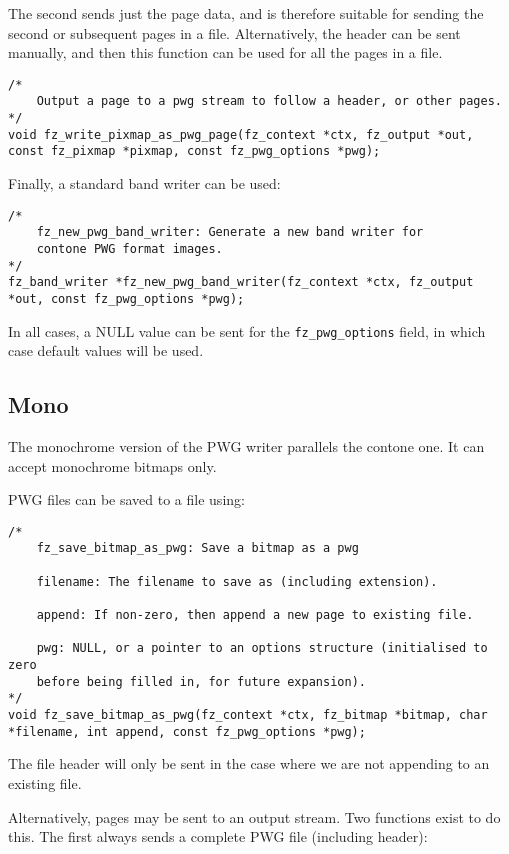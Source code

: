 \documentclass[oneside]{book}
\begin{document}
The second sends just the page data, and is therefore suitable for sending the second or subsequent pages in a file. Alternatively, the header can be sent manually, and then this function can be used for all the pages in a file.

\begin{lstlisting}
/*
	Output a page to a pwg stream to follow a header, or other pages.
*/
void fz_write_pixmap_as_pwg_page(fz_context *ctx, fz_output *out, const fz_pixmap *pixmap, const fz_pwg_options *pwg);
\end{lstlisting}

Finally, a standard band writer can be used:

\begin{lstlisting}
/*
	fz_new_pwg_band_writer: Generate a new band writer for
	contone PWG format images.
*/
fz_band_writer *fz_new_pwg_band_writer(fz_context *ctx, fz_output *out, const fz_pwg_options *pwg);
\end{lstlisting}

In all cases, a NULL value can be sent for the \texttt{fz\_pwg\_options} field, in which case default values will be used.

\subsection{Mono}

The monochrome version of the PWG writer parallels the contone one. It can accept monochrome bitmaps only.

PWG files can be saved to a file using:

\begin{lstlisting}
/*
	fz_save_bitmap_as_pwg: Save a bitmap as a pwg

	filename: The filename to save as (including extension).

	append: If non-zero, then append a new page to existing file.

	pwg: NULL, or a pointer to an options structure (initialised to zero
	before being filled in, for future expansion).
*/
void fz_save_bitmap_as_pwg(fz_context *ctx, fz_bitmap *bitmap, char *filename, int append, const fz_pwg_options *pwg);
\end{lstlisting}

The file header will only be sent in the case where we are not appending to an existing file.

Alternatively, pages may be sent to an output stream. Two functions exist to do this. The first always sends a complete PWG file (including header):
\end{document}
